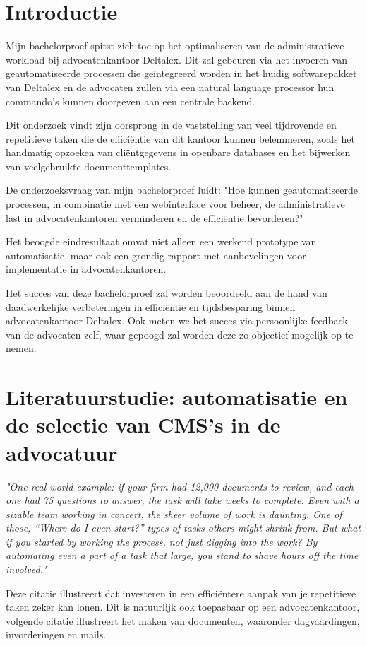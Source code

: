 \section{Introductie}%
\label{sec:introductie}
Mijn bachelorproef spitst zich toe op het optimaliseren van de administratieve workload bij advocatenkantoor Deltalex. Dit zal gebeuren via het invoeren van geautomatiseerde processen die geïntegreerd worden in het huidig softwarepakket van Deltalex en de advocaten zullen via een natural language processor hun commando's kunnen doorgeven aan een centrale backend.

Dit onderzoek vindt zijn oorsprong in de vaststelling van veel tijdrovende en repetitieve taken die de efficiëntie van dit kantoor kunnen belemmeren,
zoals het handmatig opzoeken van cliëntgegevens in openbare databases en het bijwerken van veelgebruikte documenttemplates.

De onderzoeksvraag van mijn bachelorproef luidt: "Hoe kunnen geautomatiseerde processen, in combinatie met een webinterface voor beheer, de administratieve
last in advocatenkantoren verminderen en de efficiëntie bevorderen?"

Het beoogde eindresultaat omvat niet alleen een werkend prototype van automatisatie,
maar ook een grondig rapport met aanbevelingen voor implementatie in advocatenkantoren.

Het succes van deze bachelorproef zal worden beoordeeld aan de hand van daadwerkelijke verbeteringen in efficiëntie en
tijdsbesparing binnen advocatenkantoor Deltalex. Ook meten we het succes via persoonlijke feedback van de advocaten zelf, waar gepoogd zal worden deze zo objectief mogelijk op te nemen.

\section{Literatuurstudie: automatisatie en de selectie van CMS's in de advocatuur}%
\label{sec:state-of-the-art}

\begin{displayquote}
	\textit{"One real-world example: if your firm had 12,000 documents to review, and each one had 75 questions to answer, the task will take weeks to complete. Even with a sizable team working in concert, the sheer volume of work is daunting. One of those, “Where do I even start?” types of tasks others might shrink from.
		But what if you started by working the process, not just digging into the work? By automating even a part of a task that large, you stand to shave hours off the time involved."}
	\autocite{ThomsonReuters2023}
\end{displayquote}
Deze citatie illustreert dat investeren in een efficiëntere aanpak van je repetitieve taken zeker kan lonen. Dit is natuurlijk ook toepasbaar op een advocatenkantoor, volgende citatie illustreert het maken van documenten, waaronder dagvaardingen, invorderingen en mails.

